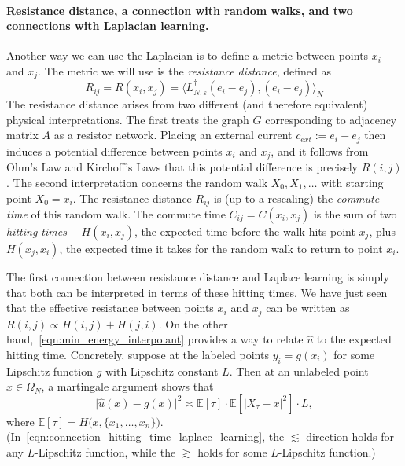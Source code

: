 \documentclass{article}
\newcommand{\1}{\mathbf{1}}
\newcommand{\Ebb}{\mathbb{E}}
\newcommand{\wh}[1]{\widehat{#1}}
\theoremstyle{definition}
\theoremstyle{remark}
\begin{document}
\paragraph{Resistance distance, a connection with random walks, and two connections with Laplacian learning.}
Another way we can use the Laplacian is to define a metric between points $x_i$ and $x_j$. The metric we will use is the \emph{resistance distance}, defined as 
\begin{equation*}
R_{ij} = R(x_i,x_j) = \bigl \langle L_{N,\varepsilon}^{\dagger}(e_i - e_j),(e_i - e_j)\bigr \rangle_N
\end{equation*}
The resistance distance arises from two different (and therefore equivalent) physical interpretations. The first treats the graph $G$ corresponding to adjacency matrix $A$ as a resistor network. Placing an external current $c_{ext} := e_i - e_j$ then induces a potential difference between points $x_i$ and $x_j$, and it follows from Ohm's Law and Kirchoff's Laws that this potential difference is precisely $R(i,j)$. The second interpretation concerns the random walk $X_0,X_1,\ldots$ with starting point $X_0 = x_i$. The resistance distance $R_{ij}$ is (up to a rescaling) the \emph{commute time} of this random walk. The commute time $C_{ij} = C(x_i,x_j)$ is the sum  of two \emph{hitting times}
---$H(x_i,x_j)$, the expected time before the walk hits point $x_j$, plus $H(x_j,x_i)$, the expected time it takes for the random walk to return to point $x_i$. 

The first connection between resistance distance and Laplace learning is simply that both can be interpreted in terms of these hitting times. We have just seen that the effective resistance between points $x_i$ and $x_j$ can be written as $R(i,j) \propto H(i,j) + H(j,i)$. On the other hand,~\eqref{eqn:min_energy_interpolant} provides a way to relate $\wh{u}$ to the expected hitting time. Concretely, suppose at the labeled points $y_i = g(x_i)$ for some Lipschitz function $g$ with Lipschitz constant $L$. Then at an unlabeled point $x \in \Omega_N$, a martingale argument shows that
\begin{equation}
\label{eqn:connection_hitting_time_laplace_learning}
\bigl|\wh{u}(x) - g(x)\bigr|^2 \asymp \Ebb[\tau] \cdot \Ebb[|X_{\tau} - x|^2]  \cdot L,
\end{equation}
where $\Ebb[\tau] = H\bigl(x,\{x_1,\ldots,x_n\}\bigr)$. (In~\eqref{eqn:connection_hitting_time_laplace_learning}, the $\lesssim$ direction holds for any $L$-Lipschitz function, while the $\gtrsim$ holds for some $L$-Lipschitz function.)
\end{document}
